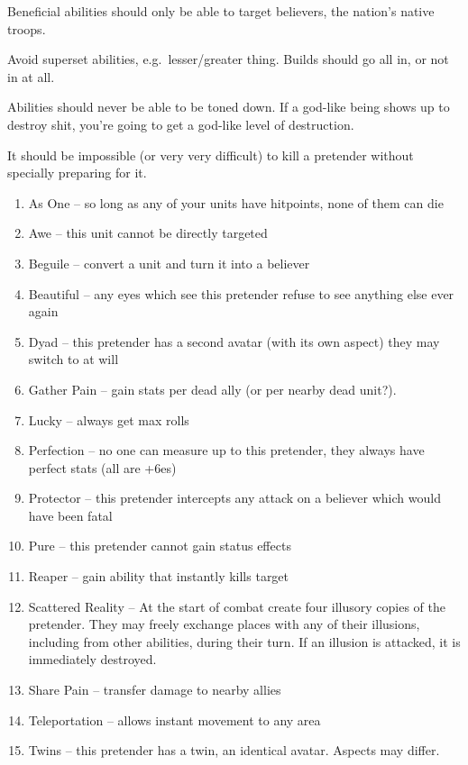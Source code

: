 \documentclass[12pt,letterpaper]{article}
\begin{document}
Beneficial abilities should only be able to target believers,
the nation's native troops.

Avoid superset abilities, e.g.\ lesser/greater thing.
Builds should go all in, or not in at all.

Abilities should never be able to be toned down.
If a god-like being shows up to destroy shit,
you're going to get a god-like level of destruction.

It should be impossible (or very very difficult) to kill a pretender
without specially preparing for it.

\begin{enumerate}
	\item As One -- so long as any of your units have hitpoints,
	      none of them can die
	\item Awe -- this unit cannot be directly targeted
	\item Beguile -- convert a unit and turn it into a believer
	\item Beautiful -- any eyes which see this pretender
	      refuse to see anything else ever again
	\item Dyad -- this pretender has a second avatar (with its own aspect)
	      they may switch to at will
	\item Gather Pain -- gain stats per dead ally (or per nearby dead unit?).
	\item Lucky -- always get max rolls
	\item Perfection -- no one can measure up to this pretender,
	      they always have perfect stats (all are +6es)
	\item Protector -- this pretender intercepts any attack on a believer
	      which would have been fatal
	\item Pure -- this pretender cannot gain status effects %
	\item Reaper -- gain ability that instantly kills target
	\item Scattered Reality --
	      At the start of combat create four illusory copies of the pretender.
	      They may freely exchange places with any of their illusions,
	      including from other abilities, during their turn.
	      If an illusion is attacked, it is immediately destroyed.
	\item Share Pain -- transfer damage to nearby allies
	\item Teleportation -- allows instant movement to any area %
	\item Twins -- this pretender has a twin, an identical avatar.
	      Aspects may differ. %
\end{enumerate}
\end{document}
